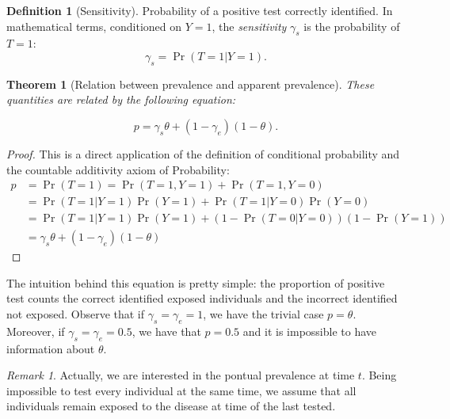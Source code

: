 \documentclass[a4paper, notitlepage, 11pt]{article}
\newtheorem{theorem}{Theorem}[]
\theoremstyle{definition}
\newtheorem{definition}{Definition}[section]
\theoremstyle{remark}
\newtheorem*{remark}{Remark}
\begin{document}
\begin{definition}[Sensitivity]
  Probability of a positive test correctly identified. In mathematical terms,
  conditioned on $Y = 1$, the {\em sensitivity} $\gamma_s$ is the probability of $T = 1$: 
  \begin{equation}
    \gamma_s = \Pr(T = 1|Y = 1). 
  \end{equation} 
\end{definition}

\begin{theorem}[Relation between prevalence and apparent prevalence] These quantities are related by the following equation:

  \begin{equation}
    p = \gamma_s\theta + (1-\gamma_e)(1-\theta).
  \end{equation}
  
\end{theorem}

\begin{proof}
  This is a direct application of the definition of conditional probability
  and the countable additivity axiom of Probability:
  \begin{equation*}
    \begin{split}
      p &= \Pr(T = 1) = \Pr(T = 1, Y = 1) + \Pr(T = 1, Y = 0) \\
      &= \Pr(T=1|Y=1)\Pr(Y=1) + \Pr(T=1|Y=0)\Pr(Y=0) \\
      &= \Pr(T=1|Y=1)\Pr(Y=1) + (1 - \Pr(T=0|Y=0))(1-\Pr(Y=1)) \\
      &= \gamma_s\theta + (1 - \gamma_e)(1-\theta)
    \end{split}
  \end{equation*} 
\end{proof}

The intuition behind this equation is pretty simple: the proportion
of positive test counts the correct identified exposed individuals and the
incorrect identified not exposed. Observe that if $\gamma_s = \gamma_e = 1$, we have the trivial case $p =
\theta$. Moreover, if $\gamma_s = \gamma_e = 0.5$, we have that
$p = 0.5$ and it is impossible to have information about $\theta$. 

\begin{remark}
  Actually, we are interested in the pontual prevalence at time $t$. Being
  impossible to test every individual at the same time, we assume that all
  individuals remain exposed to the disease at time of the last tested. 
\end{remark}
\end{document}

